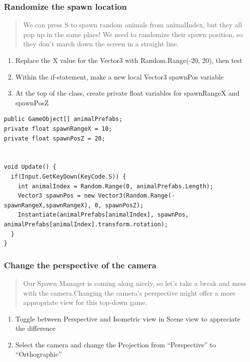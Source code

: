 \documentclass[
]{book}
\providecommand{\tightlist}{%
  \setlength{\itemsep}{0pt}\setlength{\parskip}{0pt}}
\begin{document}
\hypertarget{randomize-the-spawn-location}{%
\subsubsection{Randomize the spawn location}\label{randomize-the-spawn-location}}

\begin{quote}
We can press S to spawn random animals from animalIndex, but they all pop up in the same place! We need to randomize their spawn position, so they don't march down the screen in a straight line.
\end{quote}

\begin{enumerate}
\def\labelenumi{\arabic{enumi}.}
\tightlist
\item
  Replace the X value for the Vector3 with Random.Range(-20, 20), then test
\item
  Within the if-statement, make a new local Vector3 spawnPos variable
\item
  At the top of the class, create private float variables for spawnRangeX and spawnPosZ
\end{enumerate}

\begin{verbatim}
public GameObject[] animalPrefabs;
private float spawnRangeX = 10;
private float spawnPosZ = 20;


void Update() {
  if(Input.GetKeyDown(KeyCode.S)) {
    int animalIndex = Random.Range(0, animalPrefabs.Length);
    Vector3 spawnPos = new Vector3(Random.Range(-spawnRangeX,spawnRangeX), 0, spawnPosZ);
    Instantiate(animalPrefabs[animalIndex], spawnPos, animalPrefabs[animalIndex].transform.rotation);
  }
}
\end{verbatim}

\hypertarget{change-the-perspective-of-the-camera}{%
\subsubsection{Change the perspective of the camera}\label{change-the-perspective-of-the-camera}}

\begin{quote}
Our Spawn Manager is coming along nicely, so let's take a break and mess with the camera.Changing the camera's perspective might offer a more appropriate view for this top-down game.
\end{quote}

\begin{enumerate}
\def\labelenumi{\arabic{enumi}.}
\tightlist
\item
  Toggle between Perspective and Isometric view in Scene view to appreciate the difference
\item
  Select the camera and change the Projection from ``Perspective'' to ``Orthographic''
\end{enumerate}
\end{document}
